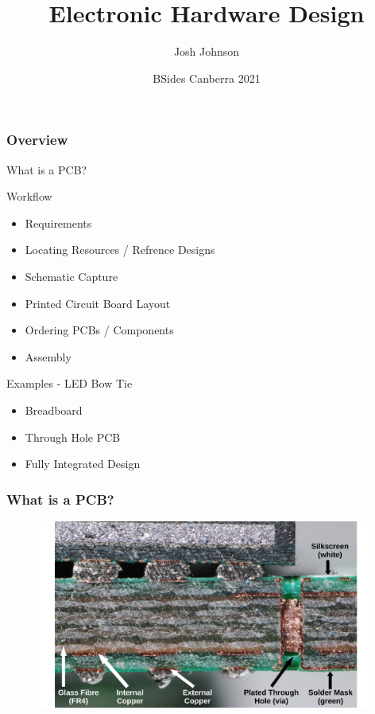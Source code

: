 \documentclass[aspectratio=169, t]{beamer}
\title[Electronic Hardware Design]{Electronic Hardware Design}
\author{Josh Johnson}
\date{BSides Canberra 2021}
\begin{document}
\begin{frame}
\titlepage
\end{frame}

\begin{frame}
\frametitle{Overview}
What is a PCB?

Workflow
\begin{itemize}
	\item Requirements
	\item Locating Resources / Refrence Designs
	\item Schematic Capture
	\item Printed Circuit Board Layout
	\item Ordering PCBs / Components
	\item Assembly
\end{itemize}
Examples - LED Bow Tie
\begin{itemize}
	\item Breadboard
	\item Through Hole PCB
	\item Fully Integrated Design
\end{itemize}
\end{frame}

\begin{frame}
	\frametitle{What is a PCB?}
	\begin{figure}
		\includegraphics[width=11cm]{images/pcb-cross-section-markup.pdf}

	\end{figure}
\end{frame}
\end{document}
